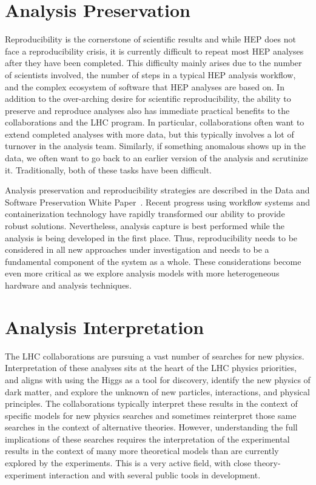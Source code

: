 \documentclass[12pt,a4paper]{article}
\begin{document}
\section{Analysis Preservation}

Reproducibility is the cornerstone of scientific results and while HEP does not face a reproducibility crisis, it is currently difficult to repeat most HEP analyses after they have been completed. This difficulty mainly arises due to the number of scientists involved, the number of steps in a typical HEP analysis workflow, and the complex ecosystem of software that HEP analyses are based on. In addition to the over-arching desire for scientific reproducibility, the ability to preserve and reproduce analyses also has immediate practical benefits to the collaborations and the LHC program. In particular, collaborations often want to extend completed analyses with more data, but this typically involves a lot of turnover in the analysis team. Similarly, if something anomalous shows up in the data, we often want to go back to an earlier version of the analysis and scrutinize it. Traditionally, both of these tasks have been difficult.  

Analysis preservation and reproducibility strategies are described in the Data and Software Preservation White Paper~\cite{HSF-CWP-2017-06}. Recent progress using workflow systems and containerization technology have rapidly transformed our ability to provide robust solutions. Nevertheless, analysis capture is best performed while the analysis is being developed in the first place. Thus, reproducibility needs to be considered in all new approaches under investigation and needs to be a fundamental component of the system as a whole. These considerations become even more critical as we explore analysis models with more heterogeneous hardware and analysis techniques.

\section{Analysis Interpretation}

The LHC collaborations are pursuing a vast number of searches for new physics. Interpretation of these analyses sits at the heart of the LHC physics priorities, and aligns with using the Higgs as a tool for discovery, identify the new physics of dark matter, and explore the unknown of new particles, interactions, and physical principles. The collaborations typically interpret these results in the context of specific models for new physics searches and sometimes reinterpret those same searches in the context of alternative theories. However, understanding the full implications of these searches requires the interpretation of the experimental results in the context of many more theoretical models than are currently explored by the experiments. This is a very active field, with close theory-experiment interaction and with several public tools in development.
\end{document}

